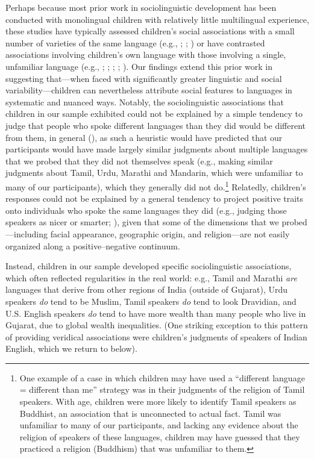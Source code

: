 \documentclass{foushee-adapted-preprint}
\begin{document}
Perhaps because most prior work in sociolinguistic development has been conducted with monolingual children with relatively little multilingual experience, these studies have typically assessed children's social associations with a small number of varieties of the same language (e.g., \cite{weatherhead2019preschoolers}; \cite{mccullough2019regional}; \cite{kinzler2013northern}) or have contrasted associations involving children's own language with those involving a single, unfamiliar language (e.g.,  \cite{liberman2017preverbal}; \cite{hirschfeld1997young}; \cite{kinzler2012children}; \cite{kinzler2007native}; \cite{moon1993two}). Our findings extend this prior work in suggesting that---when faced with significantly greater linguistic and social variability---children can nevertheless attribute social features to languages in systematic and nuanced ways. Notably, the sociolinguistic associations that children in our sample exhibited could not be explained by a simple tendency to judge that people who spoke different languages than they did would be different from them, in general (\cite{hirschfeld1997young}), as such a heuristic would have predicted that our participants would have made largely similar judgments about multiple languages that we probed that they did not themselves speak (e.g., making similar judgments about Tamil, Urdu, Marathi and Mandarin, which were unfamiliar to many of our participants), which they generally did not do.\footnote{One example of a case in which children may have used a ``different language = different than me'' strategy was in their judgments of the religion of Tamil speakers. With age, children were more likely to identify Tamil speakers as Buddhist, an association that is unconnected to actual fact. Tamil was unfamiliar to many of our participants, and lacking any evidence about the religion of speakers of these languages, children may have guessed that they practiced a religion (Buddhism) that was unfamiliar to them.} 
Relatedly, children's responses could not be explained by a general tendency to project positive traits onto individuals who spoke the same languages they did (e.g., judging those speakers as nicer or smarter; \cite{santhanagopalan2021nationality}), given that some of the dimensions that we probed---including facial appearance, geographic origin, and religion---are not easily organized along a positive--negative continuum.

Instead, children in our sample developed specific sociolinguistic associations, which often reflected regularities in the real world: e.g., Tamil and Marathi \textit{are} languages that derive from other regions of India (outside of Gujarat), Urdu speakers \textit{do} tend to be Muslim, Tamil speakers \textit{do} tend to look Dravidian, and U.S. English speakers \textit{do} tend to have more wealth than many people who live in Gujarat, due to global wealth inequalities. (One striking exception to this pattern of providing veridical associations were children's judgments of speakers of Indian English, which we return to below). 
\end{document}
